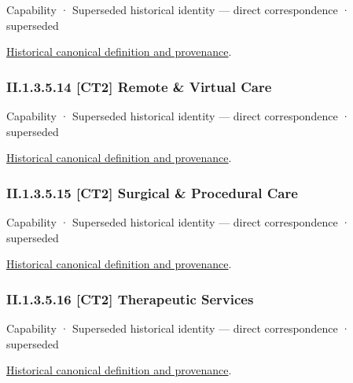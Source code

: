 \label{element:28ec21d5918a49aaac12740c69f42d77}
{\small Capability · Superseded historical identity — direct correspondence · superseded}\par
\href{../../../../continuum/strategy/capability/28ec21d5918a49aaac12740c69f42d77.md}{Historical canonical definition and provenance}.\par
\subsubsection*{II.1.3.5.14 [CT2] Remote \& Virtual Care}
\label{navigation:II.1.3.5.14}

\label{element:75e2b447659c4fdf94107d94758337ed}
{\small Capability · Superseded historical identity — direct correspondence · superseded}\par
\href{../../../../continuum/strategy/capability/75e2b447659c4fdf94107d94758337ed.md}{Historical canonical definition and provenance}.\par
\subsubsection*{II.1.3.5.15 [CT2] Surgical \& Procedural Care}
\label{navigation:II.1.3.5.15}

\label{element:8bc2a106165a4702b5f72fe46a206b69}
{\small Capability · Superseded historical identity — direct correspondence · superseded}\par
\href{../../../../continuum/strategy/capability/8bc2a106165a4702b5f72fe46a206b69.md}{Historical canonical definition and provenance}.\par
\subsubsection*{II.1.3.5.16 [CT2] Therapeutic Services}
\label{navigation:II.1.3.5.16}

\label{element:54032b52ee444bfe8b611fb9e8e2ba10}
{\small Capability · Superseded historical identity — direct correspondence · superseded}\par
\href{../../../../continuum/strategy/capability/54032b52ee444bfe8b611fb9e8e2ba10.md}{Historical canonical definition and provenance}.\par
